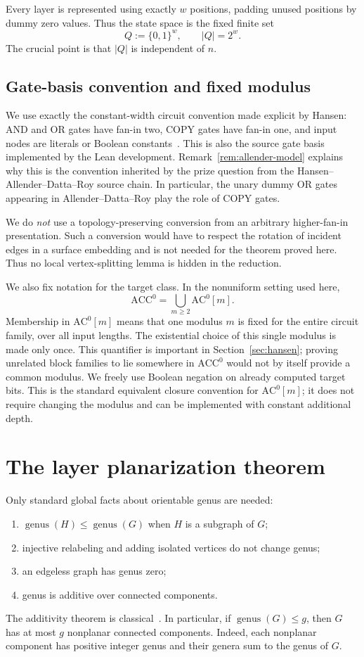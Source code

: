 \documentclass[11pt]{article}
\theoremstyle{definition}
\newcommand{\ACC}{\mathrm{ACC}^{0}}
\newcommand{\ACm}[1]{\mathrm{AC}^{0}[#1]}
\newcommand{\genus}{\operatorname{genus}}
\newcommand{\bits}{\{0,1\}}
\begin{document}
Every layer is represented using exactly $w$ positions, padding unused
positions by dummy zero values.  Thus the state space is the fixed finite set
\[
  Q:=\bits^w,
  \qquad |Q|=2^w.
\]
The crucial point is that $|Q|$ is independent of $n$.

\subsection{Gate-basis convention and fixed modulus}

We use exactly the constant-width circuit convention made explicit by Hansen:
AND and OR gates have fan-in two, COPY gates have fan-in one, and input nodes
are literals or Boolean constants~\cite{Hansen2006}.  This is also the source
gate basis implemented by the Lean development.  Remark~\ref{rem:allender-model}
explains why this is the convention inherited by the prize question from the
Hansen--Allender--Datta--Roy source chain.  In particular, the unary dummy OR
gates appearing in Allender--Datta--Roy play the role of COPY gates.

We do \emph{not} use a topology-preserving conversion from an arbitrary
higher-fan-in presentation.  Such a conversion would have to respect the
rotation of incident edges in a surface embedding and is not needed for the
theorem proved here.  Thus no local vertex-splitting lemma is hidden in the
reduction.

We also fix notation for the target class.  In the nonuniform setting used
here,
\[
  \ACC=\bigcup_{m\ge2}\ACm{m}.
\]
Membership in \(\ACm{m}\) means that one modulus \(m\) is fixed for the entire
circuit family, over all input lengths.  The existential choice of this single
modulus is made only once.  This quantifier is important in
Section~\ref{sec:hansen}; proving unrelated block families to lie somewhere in
\(\ACC\) would not by itself provide a common modulus.  We freely use Boolean
negation on already computed target bits.  This is the standard equivalent
closure convention for \(\ACm{m}\); it does not require changing the modulus
and can be implemented with constant additional depth.

\section{The layer planarization theorem}\label{sec:planarization}

Only standard global facts about orientable genus are needed:
\begin{enumerate}[label=(G\arabic*)]
  \item $\genus(H)\le \genus(G)$ when $H$ is a subgraph of $G$;
  \item injective relabeling and adding isolated vertices do not change genus;
  \item an edgeless graph has genus zero;
  \item genus is additive over connected components.
\end{enumerate}
The additivity theorem is classical~\cite{BHKY1962}.  In particular, if
$\genus(G)\le g$, then $G$ has at most $g$ nonplanar connected components.
Indeed, each nonplanar component has positive integer genus and their genera
sum to the genus of $G$.
\end{document}
